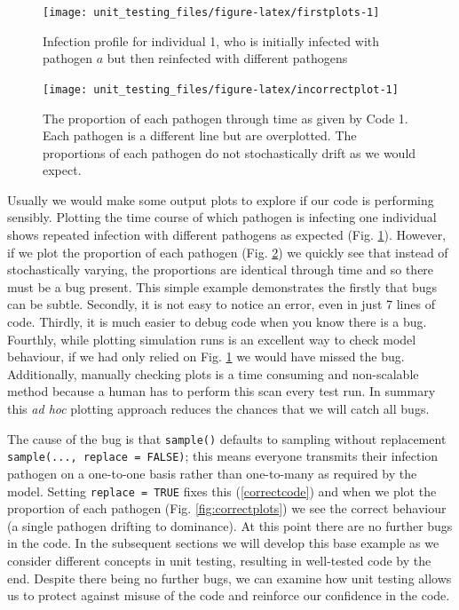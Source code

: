 \documentclass[]{elsarticle} %
\begin{document}
\begin{figure}[h]

{\centering \texttt{[image: unit\_testing\_files/figure-latex/firstplots-1]} 

}

\caption{Infection profile for individual 1, who is initially infected with pathogen $a$ but then reinfected with different pathogens}\label{fig:firstplots}
\end{figure}

\begin{figure}[h]

{\centering \texttt{[image: unit\_testing\_files/figure-latex/incorrectplot-1]} 

}

\caption{ The proportion of each pathogen through time as given by Code 1. Each pathogen is a different line but are overplotted. The proportions of each pathogen do not stochastically drift as we would expect.}\label{fig:incorrectplot}
\end{figure}

Usually we would make some output plots to explore if our code is performing sensibly.
Plotting the time course of which pathogen is infecting one individual shows repeated infection with different pathogens as expected (Fig. \ref{fig:firstplots}).
However, if we plot the proportion of each pathogen (Fig. \ref{fig:incorrectplot}) we quickly see that instead of stochastically varying, the proportions are identical through time and so there must be a bug present.
This simple example demonstrates the firstly that bugs can be subtle.
Secondly, it is not easy to notice an error, even in just 7 lines of code.
Thirdly, it is much easier to debug code when you know there is a bug.
Fourthly, while plotting simulation runs is an excellent way to check model behaviour, if we had only relied on Fig. \ref{fig:firstplots} we would have missed the bug.
Additionally, manually checking plots is a time consuming and non-scalable method because a human has to perform this scan every test run.
In summary this \emph{ad hoc} plotting approach reduces the chances that we will catch all bugs.

The cause of the bug is that \texttt{sample()} defaults to sampling without replacement \texttt{sample(...,\ replace\ =\ FALSE)}; this means everyone transmits their infection pathogen on a one-to-one basis rather than one-to-many as required by the model.
Setting \texttt{replace\ =\ TRUE} fixes this (\ref{correctcode}) and when we plot the proportion of each pathogen (Fig. \ref{fig:correctplots}) we see the correct behaviour (a single pathogen drifting to dominance).
At this point there are no further bugs in the code.
In the subsequent sections we will develop this base example as we consider different concepts in unit testing, resulting in well-tested code by the end.
Despite there being no further bugs, we can examine how unit testing allows us to protect against misuse of the code and reinforce our confidence in the code.
\newline
{}\label{correctcode}
\end{document}
